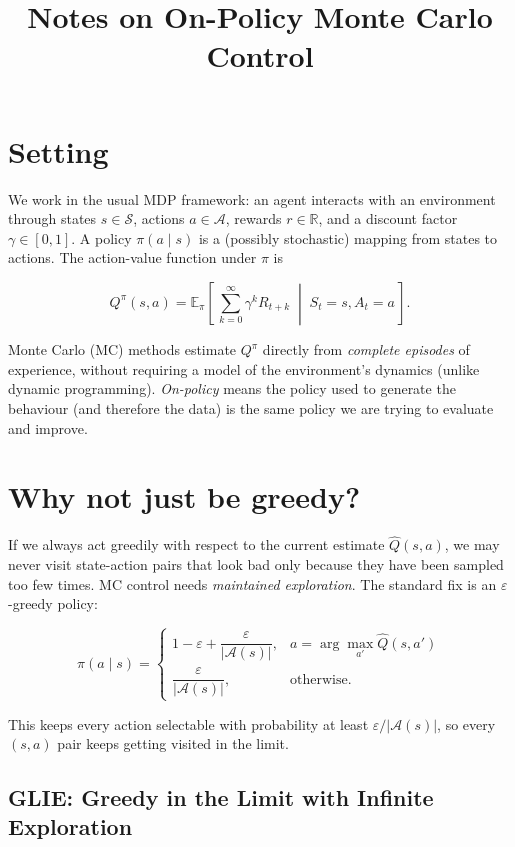 \documentclass[11pt]{article}
\title{Notes on On-Policy Monte Carlo Control}
\author{}
\date{}
\begin{document}
\maketitle

\section{Setting}

We work in the usual MDP framework: an agent interacts with an environment
through states $s \in \mathcal{S}$, actions $a \in \mathcal{A}$, rewards
$r \in \mathbb{R}$, and a discount factor $\gamma \in [0,1]$. A policy
$\pi(a \mid s)$ is a (possibly stochastic) mapping from states to actions.
The action-value function under $\pi$ is

\[
    Q^\pi(s,a) = \mathbb{E}_\pi\!\left[\, \sum_{k=0}^{\infty} \gamma^k R_{t+k} \;\middle|\; S_t = s, A_t = a \,\right].
\]

Monte Carlo (MC) methods estimate $Q^\pi$ directly from \emph{complete episodes}
of experience, without requiring a model of the environment's dynamics
(unlike dynamic programming). \emph{On-policy} means the policy used to
generate the behaviour (and therefore the data) is the same policy we are
trying to evaluate and improve.

\section{Why not just be greedy?}

If we always act greedily with respect to the current estimate
$\hat{Q}(s,a)$, we may never visit state-action pairs that look bad only
because they have been sampled too few times. MC control needs
\emph{maintained exploration}. The standard fix is an $\varepsilon$-greedy
policy:

\[
    \pi(a \mid s) =
    \begin{cases}
        1 - \varepsilon + \dfrac{\varepsilon}{|\mathcal{A}(s)|}, & a = \arg\max_{a'} \hat{Q}(s,a') \\[4pt]
        \dfrac{\varepsilon}{|\mathcal{A}(s)|}, & \text{otherwise.}
    \end{cases}
\]

This keeps every action selectable with probability at least
$\varepsilon / |\mathcal{A}(s)|$, so every $(s,a)$ pair keeps getting
visited in the limit.

\subsection{GLIE: Greedy in the Limit with Infinite Exploration}
\end{document}
